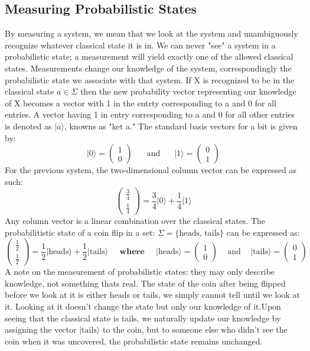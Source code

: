 \documentclass[11pt]{scrartcl}
\begin{document}
\subsection{Measuring Probabilistic States}
By measuring a system, we mean that we look at the system and unambiguously recognize whatever classical state it is in. 
We can never "see" a system in a probabilistic state; a measurement will yield exactly one of the allowed classical states.
Measurements change our knowledge of the system, correspondingly the probabilistic state we associate with that system.
If X is recognized to be in the classical state $a\in \Sigma$ then the new probability vector representing our knowledge of X
becomes a vector with 1 in the entrty corresponding to a and 0 for all entries. A vector having 1 in entry corresponding to a and 0 for all other entries
is denoted as $\vert a \rangle$, knowns as "ket a." The standard basis vectors for a bit is given by:
$$\vert 0 \rangle = \begin{pmatrix} 1 \\ 0\end{pmatrix} \;\;\;\;\;  \text{   and   } \;\;\;\;\;
\vert 1 \rangle = \begin{pmatrix} 0 \\ 1\end{pmatrix}$$
For the previous system, the two-dimensional column vector can be expressed as such:
$$\begin{pmatrix} \frac{3}{4} \\ \frac{1}{4}\end{pmatrix} = \frac{3}{4}\vert 0 \rangle + \frac{1}{4}\vert 1 \rangle$$
Any column vector is a linear combination over the classical states.
The probabilitistic state of a coin flip in a set: $\Sigma = \{\text{heads, tails}\}$ can be expressed as:
$$\begin{pmatrix} \frac{1}{2} \\ \frac{1}{2}\end{pmatrix} = \frac{1}{2}\vert \text{heads} \rangle + \frac{1}{2}\vert \text{tails} \rangle
\;\;\;\;\; \textbf{where} \;\;\;\;\; \vert  \text{heads} \rangle = \begin{pmatrix} 1 \\ 0\end{pmatrix} \;\;\;  \text{   and   } \;\;\; \vert  \text{tails} \rangle = \begin{pmatrix} 0 \\ 1\end{pmatrix}$$
A note on the measurement of probabilistic states: they may only describe knowledge, not something thats real.
The state of the coin after being flipped before we look at it is either heads or tails, we simply cannot tell until we look at it.
Looking at it doesn't change the state but only our knowledge of it.Upon seeing that the classical state is tails, we naturally update our knowledge by assigning the vector $\vert\text{tails}\rangle$ to the coin, but to someone else who didn't see the coin when it was uncovered, the probabilistic state remains unchanged.
\end{document}

